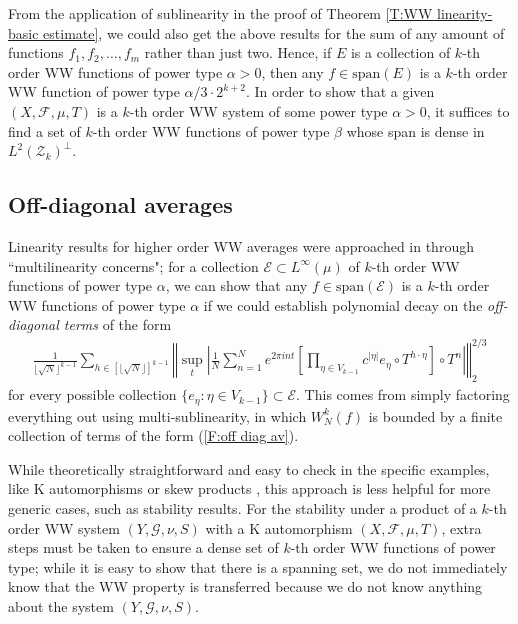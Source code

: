\documentclass[11pt, oneside]{amsart}   	%
\newcommand{\1}{\mathbbm{1}}
\newcommand{\floor}[1]{\lfloor#1\rfloor}
\theoremstyle{definition}
\begin{document}
From the application of sublinearity in the proof of Theorem \ref{T:WW linearity- basic estimate}, we could also get the above results for the sum of any amount of functions $f_1, f_2, \dots, f_m$ rather than just two. Hence, if $E$ is a collection of $k$-th order WW functions of power type $\alpha > 0$, then any $f\in \text{span}(E)$ is a $k$-th order WW function of power type $\alpha / 3 \cdot 2^{k+2}$. In order to show that a given $(X, \mathcal{F}, \mu, T)$ is a $k$-th order WW system of some power type $\alpha >0$, it suffices to find a set of $k$-th order WW functions of power type $\beta$ whose span is dense in $L^2(\mathcal{Z}_k)^\perp$.


\subsection{Off-diagonal averages}\label{S:Off-diag}

Linearity results for higher order WW averages were approached in \cite{assani2024higherorderwienerwintnersystems} through ``multilinearity concerns"; for a collection $\mathcal{E}\subset L^\infty(\mu)$ of $k$-th order WW functions of power type $\alpha$, we can show that any $f\in \text{span}(\mathcal{E})$ is a $k$-th order WW functions of power type $\alpha$ if we could establish polynomial decay on the \textit{off-diagonal terms} of the form
\begin{align}\label{F:off diag av}
\frac{1}{\floor{\sqrt{N}}^{k-1}} \sum_{h \in [\floor{\sqrt{N}}]^{k-1}} \left\Vert\sup_t \left| \frac{1}{N} \sum_{n=1}^N e^{2\pi i n t} \left[ \prod_{\eta \in V_{k-1}} c^{|\eta|} e_\eta \circ T^{h \cdot \eta}\right] \circ T^n\right| \right\Vert_2^{2/3}
\end{align}
for every possible collection $\{e_{\eta} : \eta\in V_{k-1}\}\subset \mathcal{E}$. This comes from simply factoring everything out using multi-sublinearity, in which $W_N^k(f)$ is bounded by a finite collection of terms of the form (\ref{F:off diag av}). 

While theoretically straightforward and easy to check in the specific examples, like K automorphisms or skew products \cite{assani2024higherorderwienerwintnersystems}, this approach is less helpful for more generic cases, such as stability results. For the stability under a product of a $k$-th order WW system $(Y, \mathcal{G}, \nu, S)$ with a K automorphism $(X, \mathcal{F}, \mu, T)$, extra steps must be taken to ensure a dense set of $k$-th order WW functions of power type; while it is easy to show that there is a spanning set, we do not immediately know that the WW property is transferred because we do not know anything about the system $(Y, \mathcal{G}, \nu, S)$.
\end{document}
